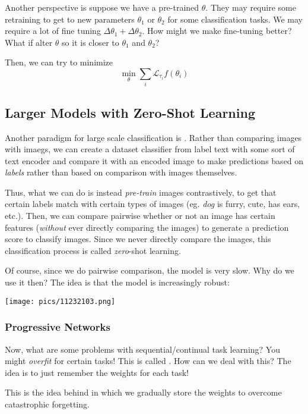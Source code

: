 \documentclass[11pt]{scrartcl}
\begin{document}
Another perspective is suppose we have a pre-trained $\theta$. They may require some retraining to get to new parameters $\theta_1$ or $\theta_2$ for some classification tasks. We may require a lot of fine tuning $\Delta\theta_1+\Delta\theta_2$. How might we make fine-tuning better? What if alter $\theta$ so it is closer to $\theta_1$ and $\theta_2$?

Then, we can try to minimize $$\min_{\theta}\sum_{i}\mathcal{L}_{\tau_i}f(\theta_i)$$

\subsection{Larger Models with Zero-Shot Learning}

Another paradigm for large scale classification is . Rather than comparing images with imaegs, we can create a dataset classifier from label text with some sort of text encoder and compare it with an encoded image to make predictions based on \textit{labels} rather than based on comparison with images themselves. 

Thus, what we can do is instead \textit{pre-train} images contrastively, to get that certain labels match with certain types of images (eg. \textit{dog} is furry, cute, has ears, etc.). Then, we can compare pairwise whether or not an image has certain features (\textit{without} ever directly comparing the images) to generate a prediction score to classify images. Since we never directly compare the images, this classification process is called \textit{zero}-shot learning.

Of course, since we do pairwise comparison, the model is very slow. Why do we use it then? The idea is that the model is increasingly robust:
\begin{center}
    \texttt{[image: pics/11232103.png]}
\end{center}

\subsubsection{Progressive Networks}
Now, what are some problems with sequential/continual task learning? You might \textit{overfit} for certain tasks! This is called . How can we deal with this? The idea is to just remember the weights for each task! 

This is the idea behind  in which we gradually store the weights to overcome catastrophic forgetting. 

\newpage
\end{document}
